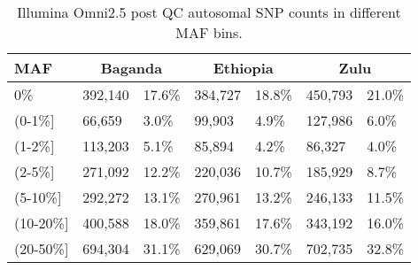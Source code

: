 \begin{table}[h]
\centering
\begin{tabular}{l|ll|ll|ll}
MAF         & \multicolumn{2}{c}{Baganda} & \multicolumn{2}{c}{Ethiopia} & \multicolumn{2}{c}{Zulu} \\ \hline
0\%         & 392,140       & 17.6\%      & 384,727       & 18.8\%       & 450,793     & 21.0\%     \\ \hline
(0-1\%{]}   & 66,659        & 3.0\%       & 99,903        & 4.9\%        & 127,986     & 6.0\%      \\ \hline
(1-2\%{]}   & 113,203       & 5.1\%       & 85,894        & 4.2\%        & 86,327      & 4.0\%      \\ \hline
(2-5\%{]}   & 271,092       & 12.2\%      & 220,036       & 10.7\%       & 185,929     & 8.7\%      \\ \hline
(5-10\%{]}  & 292,272       & 13.1\%      & 270,961       & 13.2\%       & 246,133     & 11.5\%     \\ \hline
(10-20\%{]} & 400,588       & 18.0\%      & 359,861       & 17.6\%       & 343,192     & 16.0\%     \\ \hline
(20-50\%{]} & 694,304       & 31.1\%      & 629,069       & 30.7\%       & 702,735     & 32.8\%     \\ \hline
\end{tabular}
\caption{Illumina Omni2.5 post QC autosomal \gls{SNP} counts in different \gls{MAF} bins.}
\label{tab:chip_SNPs}
\end{table}